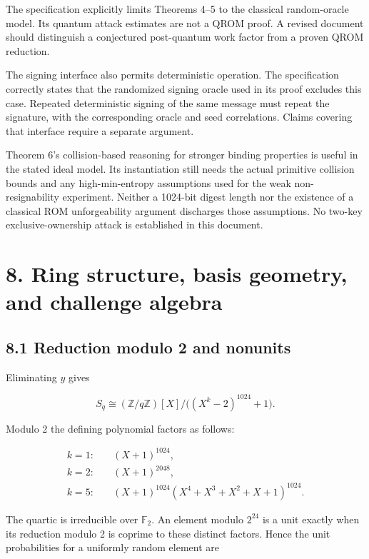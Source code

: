 \documentclass[
  american,
  10pt,
  a4paper,
]{article}
\begin{document}
The specification explicitly limits Theorems 4--5 to the classical
random-oracle model. Its quantum attack estimates are not a QROM proof.
A revised document should distinguish a conjectured post-quantum work
factor from a proven QROM reduction.

The signing interface also permits deterministic operation. The
specification correctly states that the randomized signing oracle used
in its proof excludes this case. Repeated deterministic signing of the
same message must repeat the signature, with the corresponding oracle
and seed correlations. Claims covering that interface require a separate
argument.

Theorem 6's collision-based reasoning for stronger binding properties is
useful in the stated ideal model. Its instantiation still needs the
actual primitive collision bounds and any high-min-entropy assumptions
used for the weak non-resignability experiment. Neither a 1024-bit
digest length nor the existence of a classical ROM unforgeability
argument discharges those assumptions. No two-key exclusive-ownership
attack is established in this document.

\section{8. Ring structure, basis geometry, and challenge
algebra}\label{ring-structure-basis-geometry-and-challenge-algebra}

\subsection{8.1 Reduction modulo 2 and
nonunits}\label{reduction-modulo-2-and-nonunits}

Eliminating \(y\) gives

\[
S_q\cong(\mathbb Z/q\mathbb Z)[X]/\big((X^k-2)^{1024}+1\big).
\]

Modulo 2 the defining polynomial factors as follows:

\[
\begin{aligned}
k=1:\quad &(X+1)^{1024},\\
k=2:\quad &(X+1)^{2048},\\
k=5:\quad &(X+1)^{1024}
  (X^4+X^3+X^2+X+1)^{1024}.
\end{aligned}
\]

The quartic is irreducible over \(\mathbb F_2\). An element modulo
\(2^{24}\) is a unit exactly when its reduction modulo 2 is coprime to
these distinct factors. Hence the unit probabilities for a uniformly
random element are
\end{document}
